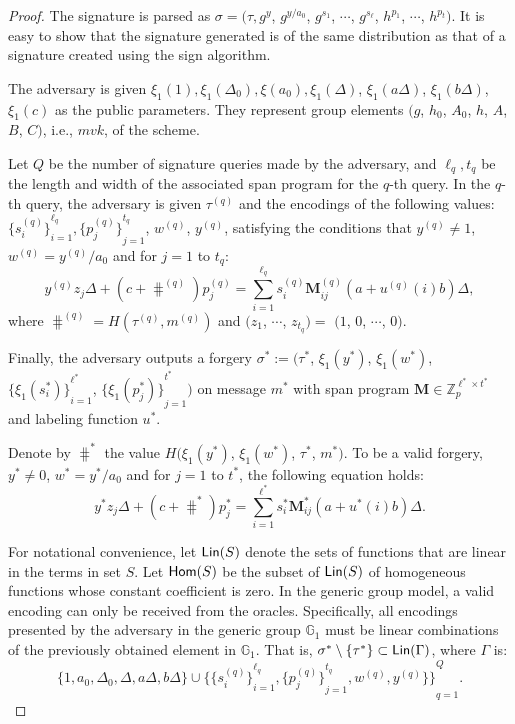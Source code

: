 \begin{proof}
  The signature is parsed as $\sigma=(\tau, g^y$, $g^{y/a_0}$, $g^{s_1}$, $\cdots$, $g^{s_\ell}$, $h^{p_1}$, $\cdots$, $h^{p_t})$. It is easy to show that the signature generated is of the same distribution as that of a signature created using the sign algorithm.

  The adversary is given $\xi_1(1), \xi_1(\Delta_0), \xi(a_0), \xi_1(\Delta)$, $\xi_1(a\Delta)$, $\xi_1(b\Delta)$, $\xi_1(c)$ as the public parameters. They represent group elements $(g$, $h_0$, $A_0$, $h$, $A$, $B$, $C)$, i.e., $mvk$, of the scheme.


  Let $Q$ be the number of signature queries made by the adversary, and $\ell_q, t_q$ be the length and width of the associated span program for the $q$-th query. In the $q$-th query, the adversary is given $\tau^{(q)}$ and the encodings of the following values: ${\{s_i^{(q)}\}}_{i=1}^{\ell_q}, {\{p_j^{(q)}\}}_{j=1}^{t_q}$, $w^{(q)}$, $y^{(q)}$, satisfying the conditions that $y^{(q)} \neq 1$, $w^{(q)} = y^{(q)}/a_0$ and for $j=1$ to $t_q$:
  $$
  y^{(q)} z_j \Delta + (c + \hash^{(q)}) p^{(q)}_j = \sum_{i=1}^{\ell_q} s^{(q)}_i \mathbf{M}^{(q)}_{ij}(a+u^{(q)}(i)b)\Delta,
  $$ where $\hash^{(q)}=H(\tau^{(q)}, m^{(q)})$ and $(z_1$, $\cdots$, $z_{t_q}) =$ $(1$, $0$, $\cdots$, $0)$.


  Finally, the adversary outputs a forgery $\sigma^{\ast}:=(\tau^\ast$, $\xi_1(y^*)$, $\xi_1(w^\ast)$, ${\{\xi_1(s^{\ast}_i)\}}_{i=1}^{\ell^{\ast}}$, ${\{\xi_1(p^{\ast}_j)\}}_{j=1}^{t^\ast})$ on message $m^{\ast}$ with span program $\mathbf{M}\in\mathbb{Z}_p^{\ell^\ast \times t^\ast}$ and labeling function $u^\ast$.

  Denote by $\hash^\ast$ the value $H(\xi_1(y^*)$, $\xi_1(w^\ast)$, $\tau^\ast$, $m^\ast)$. To be a valid forgery, $y^\ast \neq 0$, $w^\ast = y^\ast/a_0$ and for $j=1$ to $t^\ast$, the following equation holds:
  $$
  y^\ast z_j \Delta + (c + \hash^\ast)p^\ast_j = \sum_{i=1}^{\ell^\ast} s^\ast_i \mathbf{M}^\ast_{ij}(a+u^\ast(i)b)\Delta.
  $$

  For notational convenience, let $\textsf{Lin}(S)$ denote the sets of functions that are linear in the terms in set $S$. Let $\textsf{Hom}(S)$ be the subset of $\textsf{Lin}(S)$ of homogeneous functions whose constant coefficient is zero. In the generic group model, a valid encoding can only be received from the oracles. Specifically, all encodings presented by the adversary in the generic group $\mathbb{G}_1$ must be linear combinations of the previously obtained element in $\mathbb{G}_1$. That is, $\sigma^\ast \setminus \{\tau^\ast\}  \subset \textsf{Lin}(\Gamma)$, where $\Gamma$ is:
  $$
\{1, a_0, \Delta_0, \Delta, a\Delta, b\Delta\} \cup {\{{\{s_i^{(q)}\}}_{i=1}^{\ell_q}, {\{p_j^{(q)}\}}_{j=1}^{t_q}, w^{(q)}, y^{(q)}\}\}}_{q=1}^Q.
$$


\end{proof}
